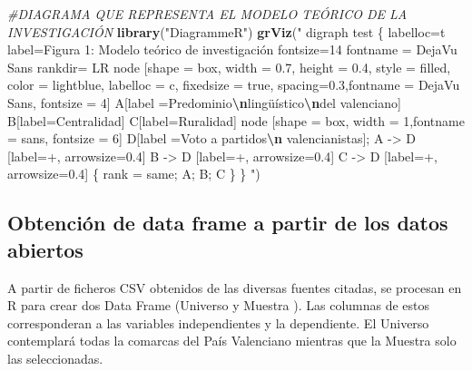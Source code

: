 \documentclass[
]{article}
\newenvironment{Shaded}{\begin{snugshade}}{\end{snugshade}}
\newcommand{\CommentTok}[1]{\textcolor[rgb]{0.56,0.35,0.01}{\textit{#1}}}
\newcommand{\FunctionTok}[1]{\textcolor[rgb]{0.13,0.29,0.53}{\textbf{#1}}}
\newcommand{\NormalTok}[1]{#1}
\newcommand{\SpecialCharTok}[1]{\textcolor[rgb]{0.81,0.36,0.00}{\textbf{#1}}}
\newcommand{\StringTok}[1]{\textcolor[rgb]{0.31,0.60,0.02}{#1}}
\begin{document}
\begin{Shaded}
\begin{Highlighting}[]
\CommentTok{\#DIAGRAMA QUE REPRESENTA EL MODELO TEÓRICO DE LA INVESTIGACIÓN}
\FunctionTok{library}\NormalTok{(}\StringTok{"DiagrammeR"}\NormalTok{)}
\FunctionTok{grViz}\NormalTok{(}\StringTok{"}
\StringTok{      digraph test \{}
\StringTok{      labelloc=\textquotesingle{}t\textquotesingle{}}
\StringTok{      label=\textquotesingle{}Figura 1: Modelo teórico de investigación\textquotesingle{}}
\StringTok{      fontsize=14}
\StringTok{      fontname = \textquotesingle{}DejaVu Sans\textquotesingle{}}
\StringTok{      }
\StringTok{        rankdir= LR}
\StringTok{        node [shape = box, width = 0.7, height = 0.4, style = filled, color = lightblue, labelloc = c, fixedsize = true, spacing=0.3,fontname = \textquotesingle{}DejaVu Sans\textquotesingle{}, fontsize = 4]}
\StringTok{        A[label =\textquotesingle{}Predominio}\SpecialCharTok{\textbackslash{}n}\StringTok{lingüístico}\SpecialCharTok{\textbackslash{}n}\StringTok{del valenciano\textquotesingle{}]}
\StringTok{        B[label=\textquotesingle{}Centralidad\textquotesingle{}]}
\StringTok{        C[label=\textquotesingle{}Ruralidad\textquotesingle{}]}
\StringTok{        node [shape = box, width = 1,fontname = \textquotesingle{}sans\textquotesingle{}, fontsize = 6]}
\StringTok{        D[label =\textquotesingle{}Voto a partidos}\SpecialCharTok{\textbackslash{}n}\StringTok{ valencianistas\textquotesingle{}];}
\StringTok{        A {-}\textgreater{} D [label=\textquotesingle{}+\textquotesingle{}, arrowsize=0.4]}
\StringTok{        B {-}\textgreater{} D [label=\textquotesingle{}+\textquotesingle{}, arrowsize=0.4]}
\StringTok{        C {-}\textgreater{} D [label=\textquotesingle{}+\textquotesingle{}, arrowsize=0.4]}
\StringTok{      \{ rank = same; A; B; C \}}
\StringTok{      \}}
\StringTok{ "}\NormalTok{)}
\end{Highlighting}
\end{Shaded}

\hypertarget{obtenciuxf3n-de-data-frame-a-partir-de-los-datos-abiertos}{%
\subsection{Obtención de data frame a partir de los datos
abiertos}\label{obtenciuxf3n-de-data-frame-a-partir-de-los-datos-abiertos}}

A partir de ficheros CSV obtenidos de las diversas fuentes citadas, se
procesan en R para crear dos Data Frame (Universo y Muestra ). Las
columnas de estos corresponderan a las variables independientes y la
dependiente. El Universo contemplará todas la comarcas del País
Valenciano mientras que la Muestra solo las seleccionadas.
\end{document}
